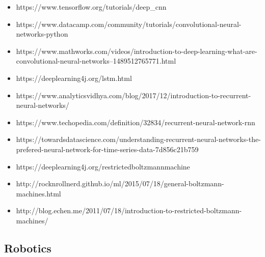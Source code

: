 \begin{itemize}
\item https://www.tensorflow.org/tutorials/deep\_cnn

\item https://www.datacamp.com/community/tutorials/convolutional-neural-networks-python

\item https://www.mathworks.com/videos/introduction-to-deep-learning-what-are-convolutional-neural-networks--1489512765771.html

\item https://deeplearning4j.org/lstm.html

\item https://www.analyticsvidhya.com/blog/2017/12/introduction-to-recurrent-neural-networks/

\item https://www.techopedia.com/definition/32834/recurrent-neural-network-rnn

\item https://towardsdatascience.com/understanding-recurrent-neural-networks-the-prefered-neural-network-for-time-series-data-7d856c21b759

\item https://deeplearning4j.org/restrictedboltzmannmachine

\item http://rocknrollnerd.github.io/ml/2015/07/18/general-boltzmann-machines.html

\item http://blog.echen.me/2011/07/18/introduction-to-restricted-boltzmann-machines/

\end{itemize}

\subsection{Robotics}

